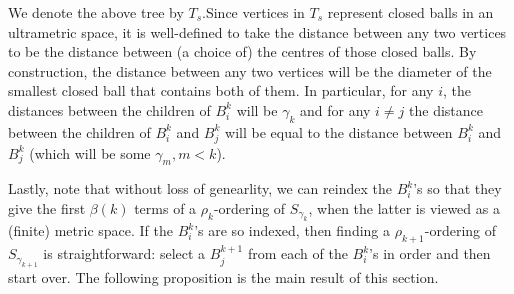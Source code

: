 

\begin{center}
\end{center}


We denote the above tree by $T_s$.Since vertices in $T_s$ represent closed balls in an ultrametric space, it is well-defined to take the distance between any two vertices to be the distance between (a choice of) the centres of those closed balls. By construction, the distance between any two vertices will be the diameter of the smallest closed ball that contains both of them.  In particular, for any $i$, the distances between the children of $B^k_i$ will be $\gamma_k$ and for any $i \neq j$ the distance between the children of $B^k_i$ and $B^k_j$ will be equal to the distance between  $B^k_i$ and $B^k_j$ (which will be some $\gamma_{m}, m <k$). 


Lastly, note that without loss of genearlity, we can reindex the $B^k_i$'s so that they give the first $\beta(k)$ terms of a $\rho_k$-ordering of $S_{\gamma_k}$, when the latter is viewed as a (finite) metric space. If the $B^k_i$'s are so indexed, then finding a $\rho_{k+1}$-ordering of $S_{\gamma_{k+1}}$ is straightforward: select a $B^{k+1}_j$ from each of the $B^k_i$'s in order and then start over.  The following proposition is the main result of this section.

